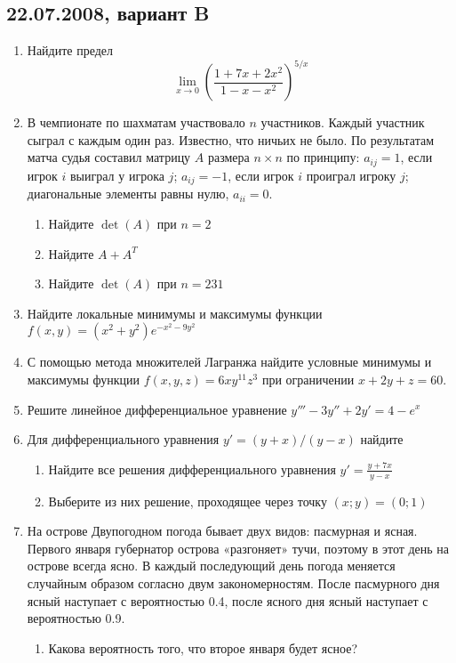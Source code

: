 \documentclass[pdftex,12pt,a4paper]{article}
\begin{document}
\subsection{22.07.2008, вариант B}
\begin{enumerate}
\item  Найдите предел 
\begin{equation}
\lim_{x\to 0} \left(\frac{1+7x+2x^2}{1-x-x^2} \right)^{5/x}
\end{equation}
\item В чемпионате по шахматам участвовало $n$ участников. Каждый участник сыграл с каждым один раз. Известно, что ничьих не было. По результатам матча судья составил матрицу $A$ размера $n\times n$ по принципу: $a_{ij}=1$, если игрок $i$ выиграл у игрока $j$; $a_{ij}=-1$, если игрок $i$ проиграл игроку $j$; диагональные элементы равны нулю, $a_{ii}=0$.
\begin{enumerate}
\item Найдите $\det(A)$ при $n=2$
\item Найдите $A+A^{T}$
\item Найдите $\det(A)$ при $n=231$
\end{enumerate}
\item Найдите локальные минимумы и максимумы функции $f(x,y)=(x^2+y^2)e^{-x^2-9y^2}$
\item С помощью метода множителей Лагранжа найдите условные минимумы и максимумы функции $f(x,y,z)=6xy^{11}z^3$ при ограничении $x+2y+z=60$.
\item Решите линейное дифференциальное уравнение $y'''-3y''+2y'=4-e^{x}$
\item Для дифференциального уравнения $y'=(y+x)/(y-x)$ найдите
\begin{enumerate}
\item Найдите все решения дифференциального уравнения $y'=\frac{y+7x}{y-x}$
\item Выберите из них решение, проходящее через точку $(x;y)=(0;1)$
\end{enumerate}
\item На острове Двупогодном погода бывает двух видов: пасмурная и ясная. Первого января губернатор острова «разгоняет»  тучи, поэтому в этот день на острове всегда ясно. В каждый последующий день погода меняется случайным образом согласно двум закономерностям. После пасмурного дня ясный наступает с  вероятностью 0.4, после ясного дня ясный наступает с вероятностью 0.9. 
\begin{enumerate}
\item Какова вероятность того, что второе января будет ясное?

\end{enumerate}
\end{enumerate}
\end{document}
